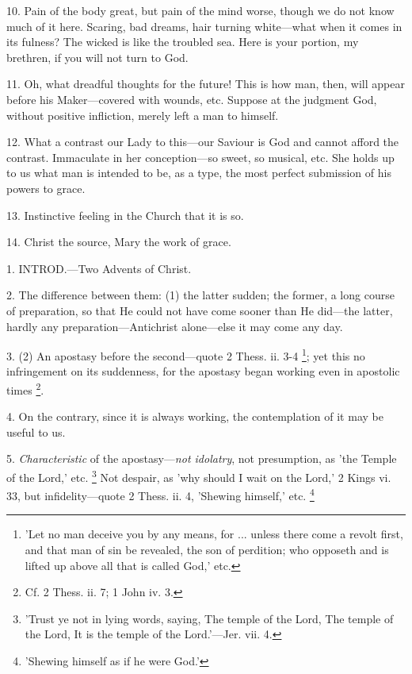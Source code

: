 10. Pain of the body great, but pain of the mind
worse, though we do not know much of it here. Scaring, bad
dreams, hair turning white—what when it comes in its fulness? The
wicked is like the troubled sea. Here is your portion, my brethren, if
you will not turn to God.

11. Oh, what dreadful thoughts for the future!
This is how man, then, will appear before his Maker—covered with
wounds, etc. Suppose at the judgment God, without positive infliction,
merely left a man to himself.

12. What a contrast our Lady to this—our
Saviour is God and cannot afford the contrast. Immaculate in her
conception—so sweet, so musical, etc. She holds up to us what man is
intended to be, as a type, the most perfect submission of his powers
to grace.

13. Instinctive feeling in the Church that it is
so.

14. Christ the source, Mary the work of grace.


1. INTROD.—Two
Advents of Christ.

2. The difference between them: (1) the latter
sudden; the former, a long course of preparation, so that He could not
have come sooner than He did—the latter, hardly any
preparation—Antichrist alone—else it may come any day.

3. (2) An apostasy before the second—quote 2
Thess. ii. 3-4 \footnote{'Let no man deceive you
by any means, for ... unless there come a revolt first, and that man
of sin be revealed, the son of perdition; who opposeth and is lifted
up above all that is called God,' etc.}; yet
this no infringement on its suddenness, for the apostasy began
working even in apostolic times \footnote{Cf. 2 Thess. ii. 7; 1
John iv. 3.}.

4. On the contrary, since it is always working,
the contemplation of it may be useful to us.

5. \emph{Characteristic} of the apostasy—\emph{not
idolatry}, not presumption, as 'the Temple of the Lord,' etc. \footnote{'Trust ye not in lying
words, saying, The temple of the Lord, The temple of the Lord, It is
the temple of the Lord.'—Jer. vii. 4.} Not despair, as 'why should I wait on the Lord,' 2 Kings vi.
33, but infidelity—quote 2 Thess. ii. 4, 'Shewing himself,' etc. \footnote{'Shewing himself as if
he were God.'}

